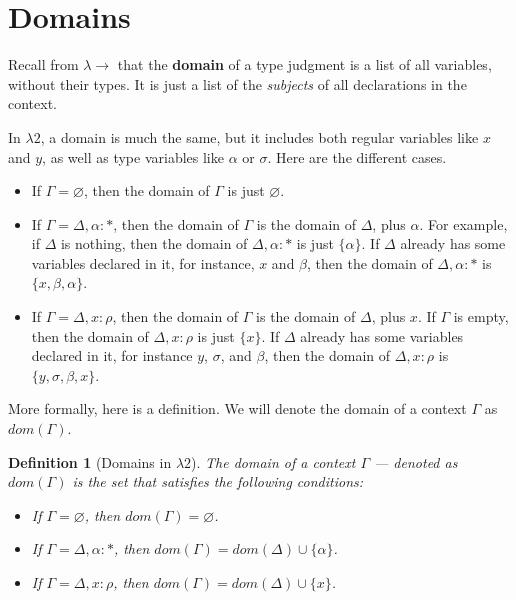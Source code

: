\documentclass{book}
\numberwithin{equation}{chapter}
\newcommand{\vocab}{\textbf}
\newtheorem{definition}{Definition}
\begin{document}
\section{Domains}

Recall from $\lambda \rightarrow$ that the \vocab{domain} of a type judgment is a list of all variables, without their types. It is just a list of the \textit{subjects} of all declarations in the context.

In $\lambda 2$, a domain is much the same, but it includes both regular variables like $x$ and $y$, as well as type variables like $\alpha$ or $\sigma$. Here are the different cases.

\begin{itemize}
\item{If $\Gamma = \varnothing$, then the domain of $\Gamma$ is just $\varnothing$.}
\item{If $\Gamma = \Delta, \alpha : *$, then the domain of $\Gamma$ is the domain of $\Delta$, plus $\alpha$. For example, if $\Delta$ is nothing, then the domain of $\Delta, \alpha : *$ is just $\{ \alpha \}$.  If $\Delta$ already has some variables declared in it, for instance, $x$ and $\beta$, then the domain of $\Delta, \alpha : *$ is $\{ x, \beta, \alpha \}$.}
\item{If $\Gamma = \Delta, x : \rho$, then the domain of $\Gamma$ is the domain of $\Delta$, plus $x$. If $\Gamma$ is empty, then the domain of $\Delta, x : \rho$ is just $\{ x \}$. If $\Delta$ already has some variables declared in it, for instance $y$, $\sigma$, and $\beta$, then the domain of $\Delta, x : \rho$ is $\{ y, \sigma, \beta, x \}$.}
\end{itemize}

\noindent
More formally, here is a definition. We will denote the domain of a context $\Gamma$ as $dom(\Gamma)$.

\begin{definition}[Domains in $\lambda 2$]
The domain of a context $\Gamma$ --- denoted as $dom(\Gamma)$ is the set that satisfies the following conditions:

\begin{itemize}
\item{If $\Gamma = \varnothing$, then $dom(\Gamma) = \varnothing$.}
\item{If $\Gamma = \Delta, \alpha : *$, then $dom(\Gamma) = dom(\Delta) \cup \{ \alpha \}$.}
\item{If $\Gamma = \Delta, x : \rho$, then $dom(\Gamma) = dom(\Delta) \cup \{ x \}$.}
\end{itemize}
\end{definition}
\end{document}
